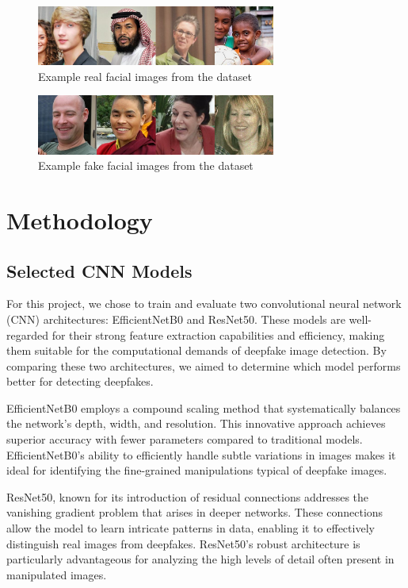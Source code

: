 \documentclass[conference]{IEEEtran}
\begin{document}
\begin{figure}[ht]
\centering
\includegraphics[width=0.7\textwidth]{reall.png}
\caption{Example real facial images from the dataset}
\label{reall}
\end{figure} 
\begin{figure}[ht]
\centering
\includegraphics[width=0.7\textwidth]{fakee.png}
\caption{Example fake facial images from the dataset}
\label{fakee}
\end{figure} 


\section*{Methodology}

\subsection*{Selected CNN Models}
For this project, we chose to train and evaluate two convolutional neural network (CNN) architectures: EfficientNetB0 and ResNet50. These models are well-regarded for their strong feature extraction capabilities and efficiency, making them suitable for the computational demands of deepfake image detection. By comparing these two architectures, we aimed to determine which model performs better for detecting deepfakes.

EfficientNetB0 employs a compound scaling method that systematically balances the network's depth, width, and resolution. This innovative approach achieves superior accuracy with fewer parameters compared to traditional models. EfficientNetB0's ability to efficiently handle subtle variations in images makes it ideal for identifying the fine-grained manipulations typical of deepfake images.

ResNet50, known for its introduction of residual connections addresses the vanishing gradient problem that arises in deeper networks. These connections allow the model to learn intricate patterns in data, enabling it to effectively distinguish real images from deepfakes. ResNet50's robust architecture is particularly advantageous for analyzing the high levels of detail often present in manipulated images.
\end{document}
